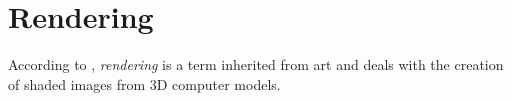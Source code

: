 \section{Rendering}
According to \cite{shirley_fcg:2002}, \emph{rendering} is a term inherited from art and deals with the creation of shaded images from 3D computer models.